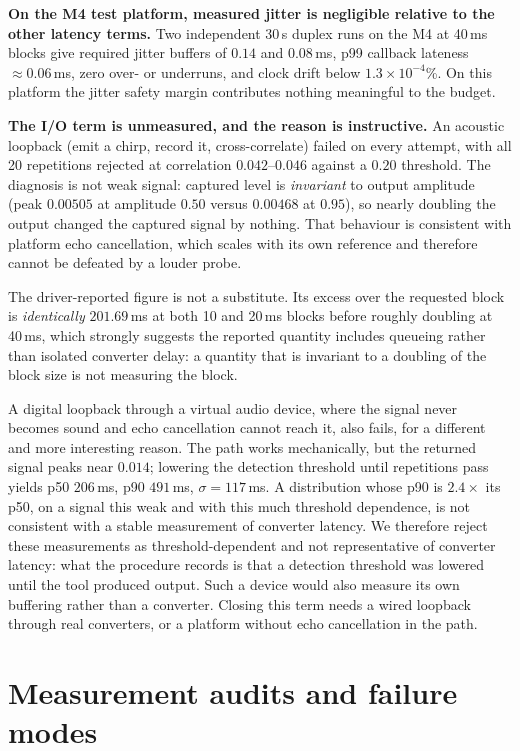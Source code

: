 \documentclass[journal]{IEEEtran}
\begin{document}
\textbf{On the M4 test platform, measured jitter is negligible relative to the
other latency terms.} Two independent 30\,s duplex runs on the M4 at
40\,ms blocks give required jitter buffers of $0.14$ and $0.08$\,ms, p99
callback lateness ${\approx}0.06$\,ms, zero over- or underruns, and clock drift
below $1.3\times10^{-4}$\%. On this platform the jitter safety margin
contributes nothing meaningful to the budget.

\textbf{The I/O term is unmeasured, and the reason is instructive.} An acoustic
loopback (emit a chirp, record it, cross-correlate) failed on every
attempt, with all 20 repetitions rejected at correlation $0.042$--$0.046$
against a $0.20$ threshold. The diagnosis is not weak signal: captured level is
\emph{invariant} to output amplitude (peak $0.00505$ at amplitude $0.50$ versus
$0.00468$ at $0.95$), so nearly doubling the output changed the captured signal
by nothing. That behaviour is consistent with platform echo cancellation, which scales
with its own reference and therefore cannot be defeated by a louder probe.

The driver-reported figure is not a substitute. Its excess over the requested
block is \emph{identically} $201.69$\,ms at both 10 and 20\,ms blocks before
roughly doubling at 40\,ms, which strongly suggests the reported quantity
includes queueing rather than isolated converter delay: a quantity that is
invariant to a doubling of the block size is not measuring the block.

A digital loopback through a virtual audio device, where the signal never
becomes sound and echo cancellation cannot reach it, also fails, for a
different and more interesting reason. The path works mechanically, but the returned signal
peaks near $0.014$; lowering the detection threshold until repetitions pass
yields p50 $206$\,ms, p90 $491$\,ms, $\sigma=117$\,ms. A distribution whose p90
is $2.4\times$ its p50, on a signal this weak and with this much threshold
dependence, is not consistent with a stable measurement of converter latency.
We therefore reject
these measurements as threshold-dependent and not representative of converter
latency: what the procedure records is that a detection threshold was lowered
until the tool produced output.
Such a device would also measure its own buffering rather than a converter.
Closing this term needs a wired loopback through real converters, or a platform
without echo cancellation in the path.

\section{Measurement audits and failure modes}
\label{sec:lessons}
\end{document}
